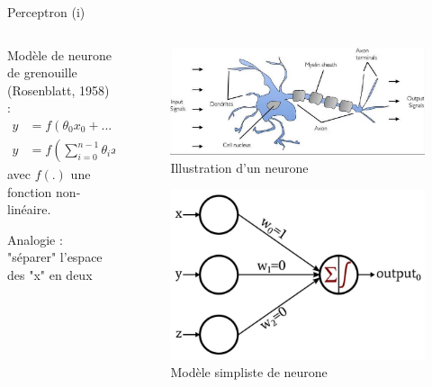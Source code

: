 \documentclass[9pt, aspectratio=169]{beamer}
\begin{document}
\begin{frame}{Perceptron (i)} %

\begin{columns}
    \begin{column}{0.6\textwidth}
Modèle de neurone de grenouille (Rosenblatt, 1958) :
\begin{align*}
	y &= f(\theta_0 x_0 + ... + \theta_{n-1} x_{n-1} + b) \\
	y &= f\left( \sum\limits_{i=0}^{n-1} \theta_i x_i + b\right)
\end{align*}
avec $f(.)$ une fonction non-linéaire.

Analogie : "séparer" l'espace des "x" en deux

    \end{column}
    \begin{column}{0.38\textwidth}
		\begin{figure}
		\includegraphics[width=\linewidth]{fig/biological_neuron.png}
		\caption{Illustration d'un neurone}
		\end{figure}
		\begin{figure}
		\includegraphics[width=0.55\linewidth]{fig/perceptron.jpg}
		\caption{Modèle simpliste de neurone}
		\end{figure}
    \end{column}
\end{columns}

\end{frame}
\end{document}
